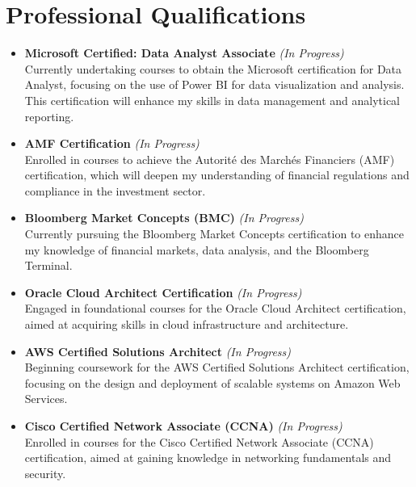 \documentclass[10pt, letterpaper]{article}
\begin{document}
    \section*{Professional Qualifications}
        \begin{itemize}

            \item \textbf{Microsoft Certified: Data Analyst Associate} \textit{(In Progress)} \\
            Currently undertaking courses to obtain the Microsoft certification for Data Analyst, focusing on the use of Power BI for data visualization and analysis. This certification will enhance my skills in data management and analytical reporting.
        
            \item \textbf{AMF Certification} \textit{(In Progress)} \\
            Enrolled in courses to achieve the Autorité des Marchés Financiers (AMF) certification, which will deepen my understanding of financial regulations and compliance in the investment sector.
        
            \item \textbf{Bloomberg Market Concepts (BMC)} \textit{(In Progress)} \\
            Currently pursuing the Bloomberg Market Concepts certification to enhance my knowledge of financial markets, data analysis, and the Bloomberg Terminal.
        
            \item \textbf{Oracle Cloud Architect Certification} \textit{(In Progress)} \\
            Engaged in foundational courses for the Oracle Cloud Architect certification, aimed at acquiring skills in cloud infrastructure and architecture.
        
            \item \textbf{AWS Certified Solutions Architect} \textit{(In Progress)} \\
            Beginning coursework for the AWS Certified Solutions Architect certification, focusing on the design and deployment of scalable systems on Amazon Web Services.
        
            \item \textbf{Cisco Certified Network Associate (CCNA)} \textit{(In Progress)} \\
            Enrolled in courses for the Cisco Certified Network Associate (CCNA) certification, aimed at gaining knowledge in networking fundamentals and security.
        
        \end{itemize}
    
\end{document}
